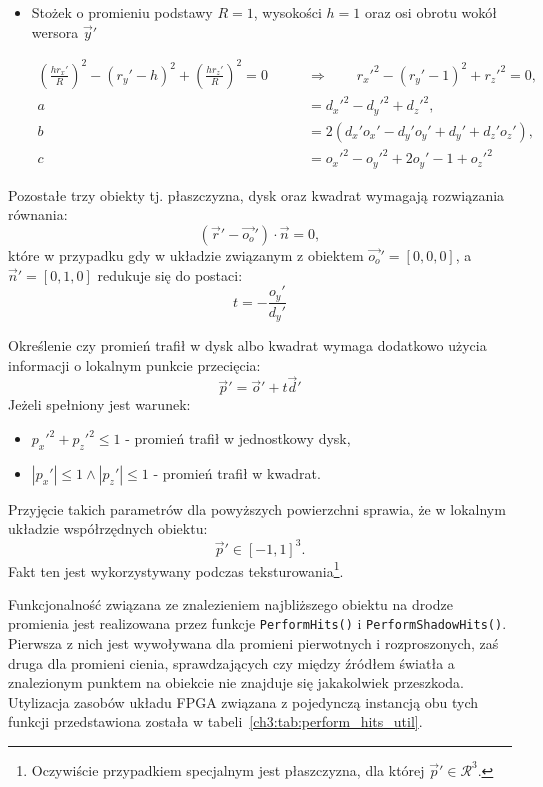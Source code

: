 \begin{enumerate}
\begin{itemize}
\item Stożek o promieniu podstawy $R=1$, wysokości $h = 1$ oraz osi obrotu wokół wersora $\vec{y}'$

\begin{align*}
\left(\frac{hr_x'}{R} \right)^2 - (r_y' - h)^2 + \left(\frac{hr_z'}{R} \right)^2 = 0\qquad &\Rightarrow\qquad r_x'^2 - (r_y' - 1)^2 + r_z'^2 = 0,\\
a &= d_x'^2 - d_y'^2 + d_z'^2,\\
b &= 2\left(d_x'o_x' - d_y'o_y' + d_y' + d_z'o_z'\right),\\
c &= o_x'^2 - o_y'^2 + 2o_y' - 1 + o_z'^2
\end{align*}

\end{itemize}

Pozostałe trzy obiekty tj. płaszczyzna, dysk oraz kwadrat wymagają rozwiązania równania:
\begin{equation*}
(\vec{r}' - \vec{o_o}') \cdot \vec{n} = 0,
\end{equation*}
które w przypadku gdy w układzie związanym z obiektem $\vec{o_o}' = [0,0,0]$, a $\vec{n}' = [0, 1, 0]$ redukuje się do postaci:
\begin{equation*}
t = -\frac{o_y'}{d_y'}
\end{equation*}

Określenie czy promień trafił w dysk albo kwadrat wymaga dodatkowo użycia informacji o lokalnym punkcie przecięcia:
\begin{equation}
\vec{p}' = \vec{o}' + t\vec{d}'
\end{equation}
Jeżeli spełniony jest warunek:
\begin{itemize}
\item $p_x'^2 + p_z'^2 \leq 1$ - promień trafił w jednostkowy dysk,
\item $|p_x'| \leq 1 \wedge |p_z'| \leq 1$ - promień trafił w kwadrat.
\end{itemize}
Przyjęcie takich parametrów dla powyższych powierzchni sprawia, że w lokalnym układzie współrzędnych obiektu:
\begin{equation*}
\vec{p}'\in [-1, 1]^3.
\end{equation*}
Fakt ten jest wykorzystywany podczas teksturowania\footnote{Oczywiście przypadkiem specjalnym jest płaszczyzna, dla której $\vec{p}'\in \mathcal{R}^3$.}.

Funkcjonalność związana ze znalezieniem najbliższego obiektu na drodze promienia jest realizowana przez funkcje \texttt{PerformHits()} i \texttt{PerformShadowHits()}. Pierwsza z nich jest wywoływana dla promieni pierwotnych i rozproszonych, zaś druga dla promieni cienia, sprawdzających czy między źródłem światła a znalezionym punktem na obiekcie nie znajduje się jakakolwiek przeszkoda. Utylizacja zasobów układu FPGA związana z pojedynczą instancją obu tych funkcji przedstawiona została w tabeli~\ref{ch3:tab:perform_hits_util}.


\end{enumerate}
